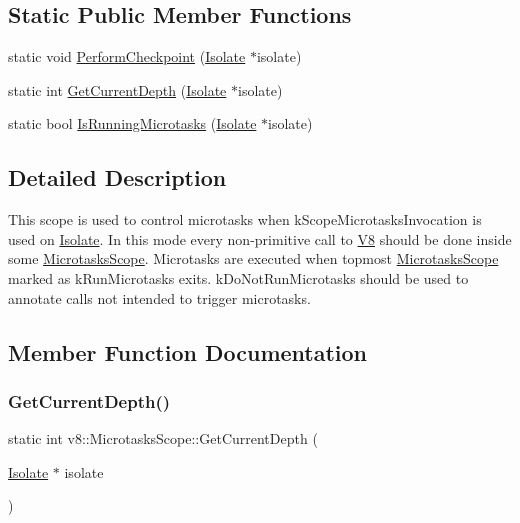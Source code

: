 \subsection*{Static Public Member Functions}
\begin{DoxyCompactItemize}
\item 
static void \mbox{\hyperlink{classv8_1_1MicrotasksScope_a1995095b585828067d367d5362bef65e}{Perform\+Checkpoint}} (\mbox{\hyperlink{classv8_1_1Isolate}{Isolate}} $\ast$isolate)
\item 
static int \mbox{\hyperlink{classv8_1_1MicrotasksScope_ad49e24bc69b61d7a67045cf658da1fce}{Get\+Current\+Depth}} (\mbox{\hyperlink{classv8_1_1Isolate}{Isolate}} $\ast$isolate)
\item 
static bool \mbox{\hyperlink{classv8_1_1MicrotasksScope_add7bcfed084afcd0d2729c3ac382145c}{Is\+Running\+Microtasks}} (\mbox{\hyperlink{classv8_1_1Isolate}{Isolate}} $\ast$isolate)
\end{DoxyCompactItemize}


\subsection{Detailed Description}
This scope is used to control microtasks when k\+Scope\+Microtasks\+Invocation is used on \mbox{\hyperlink{classv8_1_1Isolate}{Isolate}}. In this mode every non-\/primitive call to \mbox{\hyperlink{classv8_1_1V8}{V8}} should be done inside some \mbox{\hyperlink{classv8_1_1MicrotasksScope}{Microtasks\+Scope}}. Microtasks are executed when topmost \mbox{\hyperlink{classv8_1_1MicrotasksScope}{Microtasks\+Scope}} marked as k\+Run\+Microtasks exits. k\+Do\+Not\+Run\+Microtasks should be used to annotate calls not intended to trigger microtasks. 

\subsection{Member Function Documentation}
\mbox{\label{classv8_1_1MicrotasksScope_ad49e24bc69b61d7a67045cf658da1fce}} 
\subsubsection{\texorpdfstring{Get\+Current\+Depth()}{GetCurrentDepth()}}
{\footnotesize\ttfamily static int v8\+::\+Microtasks\+Scope\+::\+Get\+Current\+Depth (\begin{DoxyParamCaption}\item[{\mbox{\hyperlink{classv8_1_1Isolate}{Isolate}} $\ast$}]{isolate }\end{DoxyParamCaption})\hspace{0.3cm}{\ttfamily [static]}}

